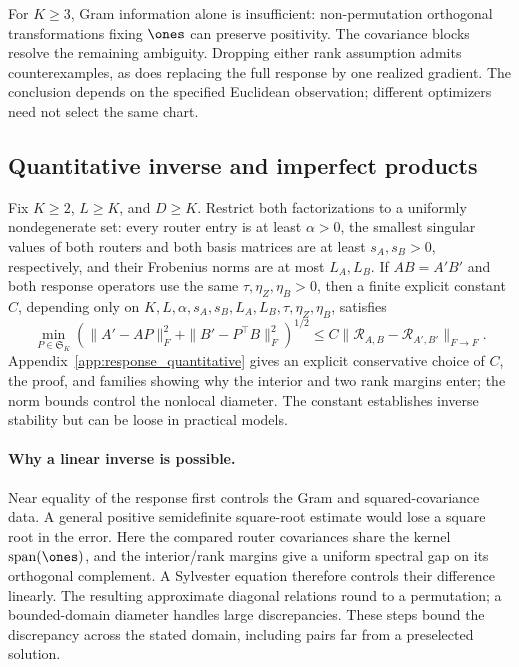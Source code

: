 For $K\ge3$, Gram information alone is insufficient: non-permutation orthogonal
transformations fixing $\ones$ can preserve positivity. The covariance blocks resolve the remaining ambiguity. Dropping either rank assumption admits
counterexamples, as does replacing the full response by one realized
gradient. The conclusion depends on the specified Euclidean observation; different
optimizers need not select the same chart.

\subsection{Quantitative inverse and imperfect products}
\label{sec:quantitative}

\begin{corollary}
\label{cor:response_stability}
Fix \(K\ge2\), \(L\ge K\), and \(D\ge K\).  Restrict both
factorizations to a uniformly nondegenerate set: every router entry is at
least \(\alpha>0\), the smallest singular values of both routers and both
basis matrices are at least \(s_A,s_B>0\), respectively, and their Frobenius
norms are at most \(L_A,L_B\).  If \(AB=A'B'\) and both response operators
use the same \(\tau,\eta_Z,\eta_B>0\), then a finite explicit constant \(C\),
depending only on
\(K,L,\alpha,s_A,s_B,L_A,L_B,\tau,\eta_Z,\eta_B\), satisfies
\begin{equation}
 \min_{P\in\mathfrak S_K}
 \left(\|A'-AP\|_F^2+\|B'-P^\top B\|_F^2\right)^{1/2}
 \le C\|\mathcal R_{A,B}-\mathcal R_{A',B'}\|_{F\to F}.
 \label{eq:response_stability_main}
\end{equation}
Appendix~\ref{app:response_quantitative} gives an explicit conservative choice of \(C\), the proof, and families showing why
the interior and two rank margins enter; the norm bounds control the nonlocal
diameter.  The constant establishes inverse stability but can be loose in practical models.
\end{corollary}


\paragraph{Why a linear inverse is possible.}
Near equality of the response first controls the Gram and squared-covariance
data. A general positive semidefinite square-root estimate would lose a
square root in the error. Here the compared router covariances share the
kernel $\operatorname{span}(\ones)$, and the interior/rank margins give
a uniform spectral gap on its orthogonal complement. A Sylvester equation
therefore controls their difference linearly. The resulting approximate
diagonal relations round to a permutation; a bounded-domain diameter
handles large discrepancies. These steps bound the discrepancy across the stated domain, including
pairs far from a preselected solution.

